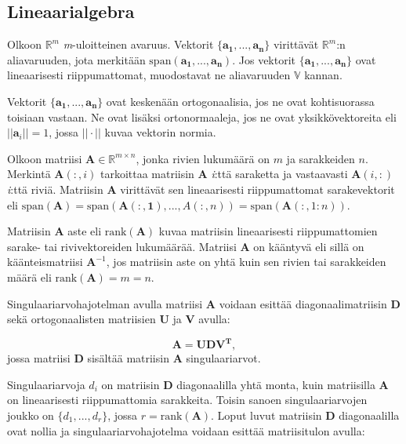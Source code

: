 \subsection{Lineaarialgebra}

Olkoon $\mathbb{R}^m$ \textit{m}-uloitteinen avaruus. Vektorit $\{\mathbf{a_1,...,a_n}\}$ virittävät $\mathbb{R}^m$:n aliavaruuden, jota merkitään $\text{span}(\mathbf{a_1,...,a_n})$. Jos vektorit $\{\mathbf{a_1,...,a_n}\}$ ovat lineaarisesti riippumattomat, muodostavat ne aliavaruuden $\mathbb{V}$ kannan.

Vektorit $\{\mathbf{a_1,...,a_n}\}$ ovat keskenään ortogonaalisia, jos ne ovat kohtisuorassa toisiaan vastaan. Ne ovat lisäksi ortonormaaleja, jos ne ovat yksikkövektoreita eli $||\mathbf{a}_i||=1$, jossa $||\cdot||$ kuvaa vektorin normia.

Olkoon matriisi $\mathbf{A}\in \mathbb{R}^{m\times n}$, jonka rivien lukumäärä on $\mathit{m}$ ja sarakkeiden $\mathit{n}$. Merkintä $\mathbf{A}(:,i)$ tarkoittaa matriisin \textbf{A} \textit{i}:ttä saraketta ja vastaavasti $\mathbf{A}(i,:)$ \textit{i}:ttä riviä. Matriisin \textbf{A} virittävät sen lineaarisesti riippumattomat sarakevektorit eli $\text{span}(\mathbf{A}) = \text{span}(\mathbf{A(:,1)},...,A(:,n)) = \text{span}(\mathbf{A}(:,1:n))$. 

Matriisin \textbf{A} aste eli $\text{rank}(\textbf{A})$ kuvaa matriisin lineaarisesti riippumattomien sarake- tai rivivektoreiden lukumäärää. Matriisi \textbf{A} on kääntyvä eli sillä on käänteismatriisi $\mathbf{A}^{-1}$, jos matriisin aste on yhtä kuin sen rivien tai sarakkeiden määrä eli $\text{rank}(\textbf{A})=m=n$.

Singulaariarvohajotelman avulla matriisi \textbf{A} voidaan esittää diagonaalimatriisin \textbf{D} sekä ortogonaalisten matriisien \textbf{U} ja \textbf{V} avulla:

\begin{equation}
    \mathbf{A = UDV^T,}
    \label{eq:svd}
\end{equation}
jossa matriisi \textbf{D} sisältää matriisin \textbf{A} singulaariarvot.

Singulaariarvoja $d_i$ on matriisin $\mathbf{D}$ diagonaalilla yhtä monta, kuin matriisilla $\mathbf{A}$ on lineaarisesti riippumattomia sarakkeita. Toisin sanoen singulaariarvojen joukko on $\{d_1,...,d_r\}$, jossa $r = \text{rank}(\mathbf{A})$. Loput luvut matriisin \textbf{D} diagonaalilla ovat nollia ja singulaariarvohajotelma voidaan esittää matriisitulon avulla: 

